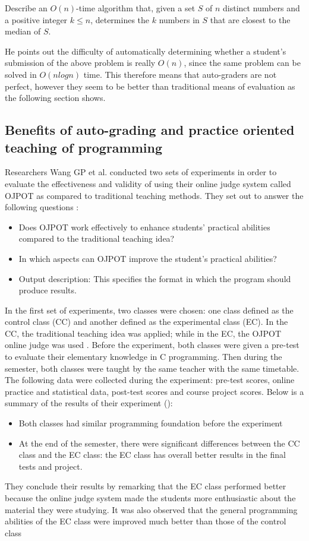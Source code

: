 \documentclass[12pt]{article}
\begin{document}
		Describe an $O(n)$-time algorithm that, given a set $S$ of $𝑛$ distinct numbers and a positive integer $k \leq n$, determines the $k$ numbers in $S$ that are closest to the median of $S$. 
		
		He points out the difficulty of automatically determining whether a student’s submission of the above problem is really $O(n)$, since the same problem can be solved in $O(n log n)$ time. This therefore means that auto-graders are not perfect, however they seem to be better than traditional means of evaluation as the following section shows.

	\subsection{Benefits of auto-grading and practice oriented teaching of programming}
		Researchers Wang GP et al. conducted two sets of experiments \cite{ojpot} in order to evaluate the effectiveness and validity of using their online judge system called OJPOT as compared to traditional teaching methods. They set out to answer the following questions \cite{ojpot}:
		\begin{itemize}
			\item  Does OJPOT work effectively to enhance students' practical abilities compared to the
					traditional teaching idea?
			\item  In which aspects can OJPOT improve the student's practical abilities?
			\item Output description: This specifies the format in which the program should produce results.
		\end{itemize}
		In the first set of experiments, two classes were chosen: one class defined as the control class (CC) and another defined as the experimental class (EC). In the CC, the traditional teaching idea was applied; while in the EC, the OJPOT online judge was used \cite{ojpot}. Before the experiment, both classes were given a pre-test to evaluate their elementary knowledge in C programming. Then during the semester, both classes were taught by the same teacher with the same timetable. The following data were collected during the experiment: pre-test scores, online practice and statistical data, post-test scores and course project scores. Below is a summary of the results of their experiment (\cite{ojpot}):
		\begin{itemize}
			\item Both classes had similar programming foundation before the experiment
			\item At the end of the semester, there were significant differences between the CC class and
				the EC class: the EC class has overall better results in the final tests and project.
		\end{itemize}
		They conclude their results by remarking that the EC class performed better because the online
	judge system made the students more enthusiastic about the material they were studying. It was
	also observed that the general programming abilities of the EC class were improved much better
	than those of the control class
\end{document}

